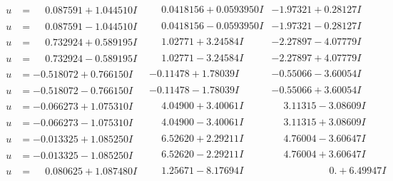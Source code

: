 \documentclass[1p]{elsarticle_modified}
\theoremstyle{definition}
\begin{document}
$$\begin{array}{c|c|c}
\begin{aligned}
u &= \phantom{-}0.087591 + 1.044510 I\end{aligned}
 & \phantom{-}0.0418156 + 0.0593950 I & -1.97321 + 0.28127 I \\ \hline\begin{aligned}
u &= \phantom{-}0.087591 - 1.044510 I\end{aligned}
 & \phantom{-}0.0418156 - 0.0593950 I & -1.97321 - 0.28127 I \\ \hline\begin{aligned}
u &= \phantom{-}0.732924 + 0.589195 I\end{aligned}
 & \phantom{-}1.02771 + 3.24584 I & -2.27897 - 4.07779 I \\ \hline\begin{aligned}
u &= \phantom{-}0.732924 - 0.589195 I\end{aligned}
 & \phantom{-}1.02771 - 3.24584 I & -2.27897 + 4.07779 I \\ \hline\begin{aligned}
u &= -0.518072 + 0.766150 I\end{aligned}
 & -0.11478 + 1.78039 I & -0.55066 - 3.60054 I \\ \hline\begin{aligned}
u &= -0.518072 - 0.766150 I\end{aligned}
 & -0.11478 - 1.78039 I & -0.55066 + 3.60054 I \\ \hline\begin{aligned}
u &= -0.066273 + 1.075310 I\end{aligned}
 & \phantom{-}4.04900 + 3.40061 I & \phantom{-}3.11315 - 3.08609 I \\ \hline\begin{aligned}
u &= -0.066273 - 1.075310 I\end{aligned}
 & \phantom{-}4.04900 - 3.40061 I & \phantom{-}3.11315 + 3.08609 I \\ \hline\begin{aligned}
u &= -0.013325 + 1.085250 I\end{aligned}
 & \phantom{-}6.52620 + 2.29211 I & \phantom{-}4.76004 - 3.60647 I \\ \hline\begin{aligned}
u &= -0.013325 - 1.085250 I\end{aligned}
 & \phantom{-}6.52620 - 2.29211 I & \phantom{-}4.76004 + 3.60647 I \\ \hline\begin{aligned}
u &= \phantom{-}0.080625 + 1.087480 I\end{aligned}
 & \phantom{-}1.25671 - 8.17694 I & \phantom{-0.000000 -}0. + 6.49947 I \\ \hline\begin{aligned}

\end{aligned}
\end{array}$$
\end{document}
